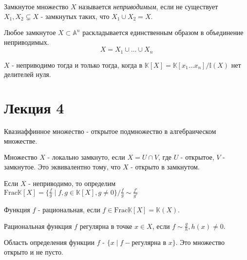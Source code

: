 \documentclass{article}
\begin{document}
\begin{definition}
    Замкнутое множество $X$ называется \textit{неприводимым},
    если не существует $X_1, X_2 \subsetneq X$ - замкнутых
    таких, что $X_1 \cup X_2 = X$.
\end{definition}

\begin{theorem}
    Любое замкнутое $X \subset \mathbb{A}^n$ раскладывается
    единственным образом в объединение неприводимых.
    $$X = X_1 \cup \dots \cup X_n$$
\end{theorem}

\begin{theorem}
    $X$ - неприводимо тогда и только тогда,
    когда в $\mathbb{K}[X] = \mathbb{K}[x_1 \dots x_n] / \mathbb{I}(X)$
    нет делителей нуля.
\end{theorem}

\section*{Лекция 4}

\begin{definition}
    Квазиаффинное множество - открытое подмножество
    в алгебраическом множестве.
\end{definition}

\begin{definition}
    Множество $X$ - локально замкнуто, если
    $X = U \cap V$, где $U$ - открытое, $V$ - замкнутое.
    Это эквивалентно тому, что $X$ - открыто в замкнутом.
\end{definition}

\begin{definition}
    Если $X$ - неприводимо, то определим
    $\text{Frac} \mathbb{K}[X] = \{\frac{f}{g} \mid
    f, g \in \mathbb{K}[X], g \neq 0\} / \frac{f}{g} \sim
    \frac{f'}{g'}$
\end{definition}

\begin{definition}
    Функция $f$ - рациональная, если
    $f \in \text{Frac} \mathbb{K}[X] = \mathbb{K}(X)$.
\end{definition}

\begin{definition}
    Рациональная функция $f$ регулярна в точке $x \in X$, если
    $f \sim \frac{g}{h}, h(x) \neq 0$.
\end{definition}

\begin{definition}
    Область определения функции $f$ -
    $\{x \mid f - \text{регулярна в } x\}$. Это множество открыто
    и не пусто.
\end{definition}
\end{document}
